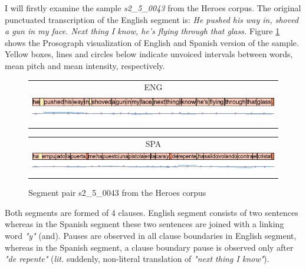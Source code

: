 I will firstly examine the sample \textit{s2\_5\_0043} from the Heroes corpus. The original punctuated transcription of the English segment is: \textit{He pushed his way in, shoved a gun in my face. Next thing I know, he's flying through that glass.} Figure \ref{figure:heroes_viz_1} shows the Prosograph visualization of English and Spanish version of the sample. Yellow boxes, lines and circles below indicate unvoiced intervals between words, mean pitch and mean intensity, respectively.

\begin{figure}[h!]
\begin{minipage}{\textwidth}
\begin{tabular}{c}
ENG \\
\includegraphics[height=1.2cm, width=\textwidth]{img/s2_5_0043-EN.png} \\
\end{tabular}
\end{minipage}
\begin{minipage}{\textwidth}
\begin{tabular}{c}
SPA \\
\includegraphics[width=\textwidth]{img/s2_5_0043-ES.png} \\
\end{tabular}
\end{minipage}
\caption{Segment pair s2\_5\_0043 from the Heroes corpus}
\label{figure:heroes_viz_1}
\end{figure}

Both segments are formed of 4 clauses. English segment consists of two sentences whereas in the Spanish segment these two sentences are joined with a linking word \textit{"y"} (and). Pauses are observed in all clause boundaries in English segment, whereas in the Spanish segment, a clause boundary pause is observed only after \textit{"de repente"} (\textit{lit.} suddenly, non-literal translation of \textit{"next thing I know"}). 

